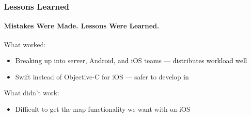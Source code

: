 \documentclass[xcolor=dvipsnames]{beamer}
\begin{document}
\begin{darkframes}
\begin{frame}
    \end{frame}


    \begin{frame}
        \frametitle{Lessons Learned}
        \framesubtitle{Mistakes Were Made. Lessons Were Learned.}

        What worked:

        \begin{itemize}
            \item Breaking up into server, Android, and iOS teams --- distributes workload well
            \item Swift instead of Objective-C for iOS --- safer to develop in
        \end{itemize}

        What didn't work:

        \begin{itemize}
            \item Difficult to get the map functionality we want with  on iOS
        \end{itemize}
    \end{frame}

\end{darkframes}
\end{document}
